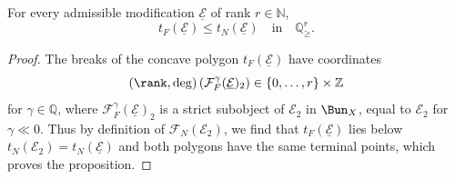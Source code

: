 \begin{prop}\label{prop:OnAdmModif_CompFarguesNewton}
For every admissible modification $\underline{\mathcal{E}}$ of rank $r\in\mathbb{N}$,
\[
t_{F}(\underline{\mathcal{E}})\leq t_{N}(\underline{\mathcal{E}})\quad\text{in}\quad\mathbb{Q}_{\geq}^{r}.
\]
\end{prop}
\begin{proof}
The breaks of the concave polygon $t_{F}(\underline{\mathcal{E}})$ have coordinates
\[
\left(\rank,\deg\right)\left(\mathcal{F}_{F}^{\gamma}(\underline{\mathcal{E}})_{2}\right)\in\left\{ 0,\dots,r\right\} \times\mathbb{Z}
\]
for $\gamma\in\mathbb{Q}$, where $\mathcal{F}_{F}^{\gamma}(\underline{\mathcal{E}})_{2}$ is a strict subobject of $\mathcal{E}_{2}$ in $\Bun_{X}$, equal to $\mathcal{E}_{2}$ for $\gamma\ll0$. Thus by definition of $\mathcal{F}_{N}(\mathcal{E}_{2})$, we find that $t_{F}(\underline{\mathcal{E}})$ lies below $t_{N}(\mathcal{E}_{2})=t_{N}(\underline{\mathcal{E}})$ and both polygons have the same terminal points, which proves the proposition.
\end{proof}

\subsubsection{}

